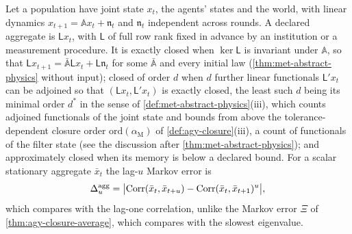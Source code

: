 \begin{definition}\label{def:env-aggregates}
Let a population have joint state $x_t$, the agents' states and the world, with linear dynamics $x_{t+1}=\mathbb Ax_t+\mathfrak n_t$ and $\mathfrak n_t$ independent across rounds. A declared aggregate is $\mathsf Lx_t$, with $\mathsf L$ of full row rank fixed in advance by an institution or a measurement procedure. It is exactly closed when $\ker\mathsf L$ is invariant under $\mathbb A$, so that $\mathsf Lx_{t+1}=\bar{\mathbb A}\mathsf Lx_t+\mathsf L\mathfrak n_t$ for some $\bar{\mathbb A}$ and every initial law (\cref{thm:met-abstract-physics} without input); closed of order $d$ when $d$ further linear functionals $\mathsf L'x_t$ can be adjoined so that $(\mathsf Lx_t,\mathsf L'x_t)$ is exactly closed, the least such $d$ being its minimal order $d^\ast$ in the sense of \cref{def:met-abstract-physics}(iii), which counts adjoined functionals of the joint state and bounds from above the tolerance-dependent closure order $\mathrm{ord}(\alpha_{\mathrm M})$ of \cref{def:agy-closure}(iii), a count of functionals of the filter state (see the discussion after \cref{thm:met-abstract-physics}); and approximately closed when its memory is below a declared bound. For a scalar stationary aggregate $\bar x_t$ the lag-$u$ Markov error is
\[
\Delta^{\mathrm{agg}}_u=\bigl\lvert\operatorname{Corr}(\bar x_t,\bar x_{t+u})-\operatorname{Corr}(\bar x_t,\bar x_{t+1})^u\bigr\rvert,
\]
which compares with the lag-one correlation, unlike the Markov error $\Xi$ of \cref{thm:agy-closure-average}, which compares with the slowest eigenvalue.
\end{definition}

